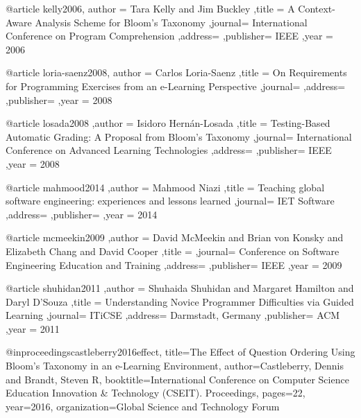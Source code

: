 @article{ kelly2006,
   author = {Tara Kelly and Jim Buckley}
  ,title  = {A Context-Aware Analysis Scheme for Bloom's Taxonomy}
  ,journal= {International Conference on Program Comprehension}
  ,address= {}
  ,publisher= {IEEE}
  ,year   = {2006}
}

@article{ loria-saenz2008,
   author = {Carlos Loria-Saenz}
  ,title  = {On Requirements for Programming Exercises from an e-Learning Perspective}
  ,journal= {}
  ,address= {}
  ,publisher= {}
  ,year   = {2008}
}

@article{ losada2008
  ,author = {Isidoro Hern\'{a}n-Losada}
  ,title  = {Testing-Based Automatic Grading: A Proposal from Bloom’s Taxonomy}
  ,journal= {International Conference on Advanced Learning Technologies}
  ,address= {}
  ,publisher= {IEEE}
  ,year   = {2008}
}

@article{ mahmood2014
  ,author = {Mahmood Niazi}
  ,title  = {Teaching global software engineering: experiences and lessons learned}
  ,journal= {IET Software}
  ,address= {}
  ,publisher= {}
  ,year   = {2014}
}

@article{ mcmeekin2009
  ,author = {David McMeekin and Brian von Konsky and Elizabeth Chang and David Cooper}
  ,title  = { }
  ,journal= { Conference on Software Engineering Education and Training }
  ,address= {}
  ,publisher= {IEEE}
  ,year   = {2009}
}

@article{ shuhidan2011
  ,author = {Shuhaida Shuhidan and Margaret Hamilton and Daryl D'Souza }
  ,title  = { Understanding Novice Programmer Difficulties via Guided Learning }
  ,journal= {ITiCSE}
  ,address= {Darmstadt, Germany}
  ,publisher= {ACM}
  ,year   = {2011}
}

@inproceedings{castleberry2016effect,
  title={The Effect of Question Ordering Using Bloom's Taxonomy in an e-Learning Environment},
  author={Castleberry, Dennis and Brandt, Steven R},
  booktitle={International Conference on Computer Science Education Innovation \& Technology (CSEIT). Proceedings},
  pages={22},
  year={2016},
  organization={Global Science and Technology Forum}
}

